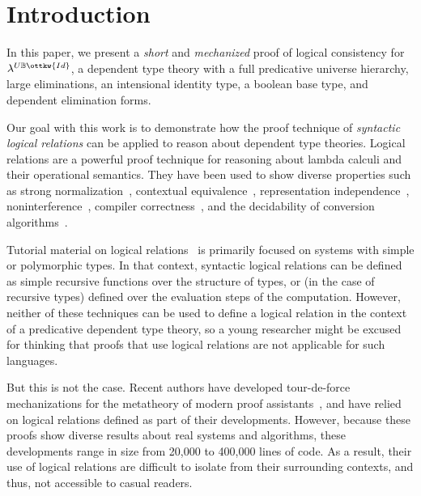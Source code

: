 \documentclass[acmsmall,screen=true,
\ifpublic review=false\else,review=true\fi
  ,anonymous=\ifanonymous true\else false\fi]{acmart}
\newcommand{\lang}{$\lambda^{U\mathbb{B}\ottkw{Id}}$\xspace}
\newcommand{\scw}[1]{}
\begin{document}
\maketitle

\section{Introduction}
In this paper, we present a \emph{short} and \emph{mechanized} proof of
logical consistency for \lang{}, a dependent type theory with a full
predicative universe hierarchy, large eliminations, an intensional identity
type, a boolean base type, and dependent elimination forms.

Our goal with this work is to demonstrate how the proof technique of
\emph{syntactic logical relations} can be applied to reason about dependent
type theories.  Logical relations are a powerful proof technique for reasoning
about lambda calculi and their operational semantics. They have been used to
show diverse properties such as strong
normalization~\citep{girard1989proofs,
  geuvers1994short}, contextual equivalence~\citep{constable1986implementing},
representation independence~\citep{pitts1998existential}, noninterference~\citep{bowman2015noninterference}, compiler correctness~\citep{benton2009biorthogonality,perconti2014compiler}, and the
decidability of conversion algorithms~\citep{harper2005equivalence,Abel12,abel2013normalization}. \scw{%
  emphasize that we are working
with syntactic logical relations.}

Tutorial material on logical relations~\citep{skorstengaard2019introduction,
  harpertait, harperkripke, pierce2002types,
  pierce2004advanced,harper2016practical} is primarily focused on systems
with simple or polymorphic types. In that context, syntactic logical relations
can be defined as simple recursive functions over the structure of types, or
(in the case of recursive types) defined over the evaluation steps of the
computation. However, neither of these techniques can be used to define a
logical relation in the context of a predicative dependent type theory, so a
young researcher might be excused for thinking that proofs that use logical
relations are not applicable for such languages.

But this is not the case. \scw{Add a sentence about pen-and-paper LR proofs for dependent type theories}
Recent authors have developed tour-de-force
mechanizations for the metatheory of modern proof
assistants~\citep{nbeincoq,decagda,martin-lof-a-la-coq,anand2014towards}, and
have relied on logical relations defined as part of their
developments. However, because these proofs show diverse results about real
systems and algorithms, these developments range in size from 20,000 to
400,000 lines of code. As a result, their use of logical relations are
difficult to isolate from their surrounding contexts, and thus, not accessible
to casual readers.
\end{document}
